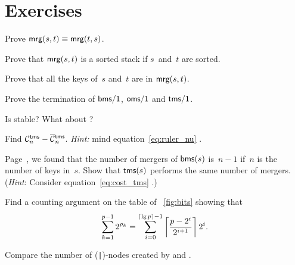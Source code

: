 \section*{Exercises}

\begin{enumerate*}

  \item Prove \(\textsf{mrg}(s,t) \equiv \textsf{mrg}(t,s)\).

  \item Prove that \(\textsf{mrg}(s,t)\) is a sorted
  stack if \(s\)~and~\(t\) are sorted.

  \item Prove that all the keys of~\(s\) and~\(t\) are in
  \(\textsf{mrg}(s,t)\).

  \item Prove the termination of \(\textsf{bms/1}\), \(\textsf{oms/1}\) and
    \(\textsf{tms/1}\).

  \item Is  stable? What about ?

  \item Find \(\C{\fun{tms}}{n} - \OC{\fun{tms}}{n}\). \emph{Hint:}
    mind equation~\eqref{eq:ruler_nu} .

  \item Page~\pageref{eq:bms_merges}, we found that the number of
    mergers of \(\textsf{bms}(s)\) is~\(n-1\) if~\(n\) is the number of
    keys in~\(s\). Show that \(\textsf{tms}(s)\) performs the same number
    of mergers. (\emph{Hint}: Consider equation~\eqref{eq:cost_tms}
    .)

  \item Find a counting argument on the table of \fig~\vref{fig:bits}
    showing that
    \begin{equation*}
      \sum_{k=1}^{p-1}{2^{\rho_k}}
      = \sum_{i=0}^{\ceiling{\lg p}-1}%
      {\left\lceil\frac{p-2^i}{2^{i+1}}\right\rceil 2^i}.
    \end{equation*}

  \item Compare the number of (\texttt{|})-nodes created by
     and .

\end{enumerate*}
